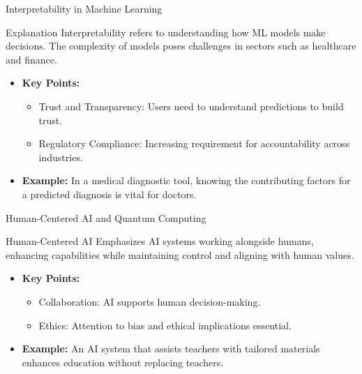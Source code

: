 \documentclass[aspectratio=169]{beamer}
\begin{document}
\begin{frame}[fragile]{Interpretability in Machine Learning}
    \begin{block}{Explanation}
        Interpretability refers to understanding how ML models make decisions. The complexity of models poses challenges in sectors such as healthcare and finance.
    \end{block}

    \begin{itemize}
        \item \textbf{Key Points:}
        \begin{itemize}
            \item Trust and Transparency: Users need to understand predictions to build trust.
            \item Regulatory Compliance: Increasing requirement for accountability across industries.
        \end{itemize}
        \item \textbf{Example:} 
            In a medical diagnostic tool, knowing the contributing factors for a predicted diagnosis is vital for doctors.
    \end{itemize}
\end{frame}

\begin{frame}[fragile]{Human-Centered AI and Quantum Computing}
    \begin{block}{Human-Centered AI}
        Emphasizes AI systems working alongside humans, enhancing capabilities while maintaining control and aligning with human values.
    \end{block}

    \begin{itemize}
        \item \textbf{Key Points:}
        \begin{itemize}
            \item Collaboration: AI supports human decision-making.
            \item Ethics: Attention to bias and ethical implications essential.
        \end{itemize}
        \item \textbf{Example:} 
            An AI system that assists teachers with tailored materials enhances education without replacing teachers.
    \end{itemize}
\end{frame}
\end{document}

